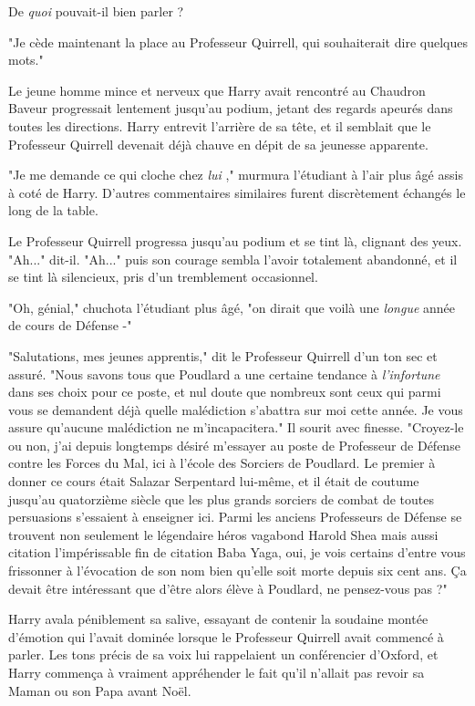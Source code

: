 De \emph{quoi}  pouvait-il bien parler ?

"Je cède maintenant la place au Professeur Quirrell, qui souhaiterait dire quelques mots."

Le jeune homme mince et nerveux que Harry avait rencontré au Chaudron Baveur progressait lentement jusqu'au podium, jetant des regards apeurés dans toutes les directions. Harry entrevit l'arrière de sa tête, et il semblait que le Professeur Quirrell devenait déjà chauve en dépit de sa jeunesse apparente.

"Je me demande ce qui cloche chez \emph{lui} ," murmura l'étudiant à l'air plus âgé assis à coté de Harry. D'autres commentaires similaires furent discrètement échangés le long de la table.

Le Professeur Quirrell progressa jusqu'au podium et se tint là, clignant des yeux. "Ah..." dit-il. "Ah..." puis son courage sembla l'avoir totalement abandonné, et il se tint là silencieux, pris d'un tremblement occasionnel.

"Oh, génial," chuchota l'étudiant plus âgé, "on dirait que voilà une \emph{longue}  année de cours de Défense -"

"Salutations, mes jeunes apprentis," dit le Professeur Quirrell d'un ton sec et assuré. "Nous savons tous que Poudlard a une certaine tendance à \emph{l'infortune}  dans ses choix pour ce poste, et nul doute que nombreux sont ceux qui parmi vous se demandent déjà quelle malédiction s'abattra sur moi cette année. Je vous assure qu'aucune malédiction ne m'incapacitera." Il sourit avec finesse. "Croyez-le ou non, j'ai depuis longtemps désiré m'essayer au poste de Professeur de Défense contre les Forces du Mal, ici à l'école des Sorciers de Poudlard. Le premier à donner ce cours était Salazar Serpentard lui-même, et il était de coutume jusqu'au quatorzième siècle que les plus grands sorciers de combat de toutes persuasions s'essaient à enseigner ici. Parmi les anciens Professeurs de Défense se trouvent non seulement le légendaire héros vagabond Harold Shea mais aussi citation l'impérissable fin de citation Baba Yaga, oui, je vois certains d'entre vous frissonner à l'évocation de son nom bien qu'elle soit morte depuis six cent ans. Ça devait être intéressant que d'être alors élève à Poudlard, ne pensez-vous pas ?"

Harry avala péniblement sa salive, essayant de contenir la soudaine montée d'émotion qui l'avait dominée lorsque le Professeur Quirrell avait commencé à parler. Les tons précis de sa voix lui rappelaient un conférencier d'Oxford, et Harry commença à vraiment appréhender le fait qu'il n'allait pas revoir sa Maman ou son Papa avant Noël.


